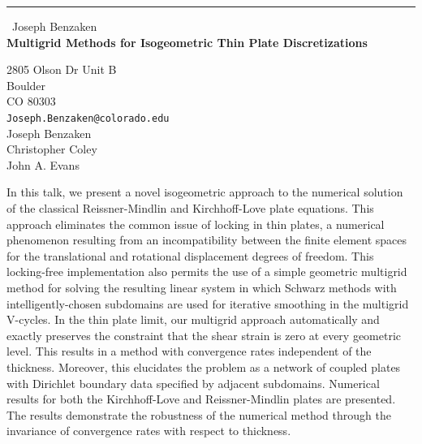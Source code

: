 \documentclass{report}
\begin{document}
\begin{center}
\rule{6in}{1pt} \
{\large Joseph Benzaken \\
{\bf Multigrid Methods for Isogeometric Thin Plate Discretizations}}

2805 Olson Dr Unit B \\ Boulder \\ CO 80303
\\
{\tt Joseph.Benzaken@colorado.edu}\\
Joseph Benzaken\\
Christopher Coley\\
John A. Evans\end{center}

In this talk, we present a novel isogeometric approach to the numerical
solution of the classical Reissner-Mindlin and Kirchhoff-Love plate
equations. This approach eliminates the common issue of locking in thin
plates, a numerical phenomenon resulting from an incompatibility between
the finite element spaces for the translational and rotational
displacement degrees of freedom. This locking-free implementation also
permits the use of a simple geometric multigrid method for solving the
resulting linear system in which Schwarz methods with
intelligently-chosen subdomains are used for iterative smoothing in the
multigrid V-cycles. In the thin plate limit, our multigrid approach
automatically and exactly preserves the constraint that the shear strain
is zero at every geometric level. This results in a method with
convergence rates independent of the thickness. Moreover, this elucidates
the problem as a network of coupled plates with Dirichlet boundary data
specified by adjacent subdomains. Numerical results for both the
Kirchhoff-Love and Reissner-Mindlin plates are presented. The results
demonstrate the robustness of the numerical method through the invariance
of convergence rates with respect to thickness.
\end{document}

